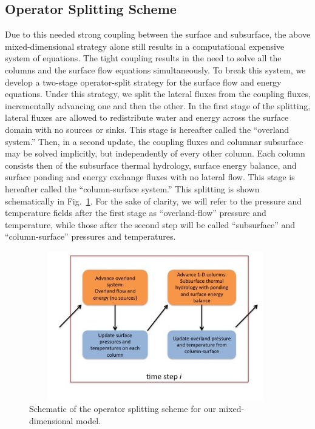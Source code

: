 \documentclass[review,11pt]{elsarticle}
\begin{document}
\subsection{Operator Splitting Scheme}
Due to this needed strong coupling between the surface and subsurface, the above mixed-dimensional strategy alone still results in a computational expensive system of equations.
The tight coupling results in the need to solve all the columns and the surface flow equations simultaneously.
To break this system, we develop a two-stage operator-split strategy for the surface flow and energy equations.
Under this strategy, we split the lateral fluxes from the coupling fluxes, incrementally advancing one and then the other.
In the first stage of the splitting, lateral fluxes are allowed to redistribute water and energy across the surface domain with no sources or sinks.
This stage is hereafter called the ``overland system.''
Then, in a second update, the coupling fluxes and columnar subsurface may be solved implicitly, but independently of every other column.
Each column consists then of the subsurface thermal hydrology, surface energy balance, and surface ponding and energy exchange fluxes with no lateral flow.
This stage is hereafter called the ``column-surface system.''
This splitting is shown schematically in Fig.~\ref{coupling-schematic}.
For the sake of clarity, we will refer to the pressure and temperature fields after the first stage as ``overland-flow'' pressure and temperature, while those after the second step will be called ``subsurface'' and ``column-surface'' pressures and temperatures.
%
\begin{figure}[h]
\centering
\includegraphics[height = 6.5cm, width=11cm]{figures/Figure5-new.jpg}
\caption{Schematic of the operator splitting scheme for our mixed-dimensional model.}
\label{coupling-schematic}
\end{figure}


\end{document}

